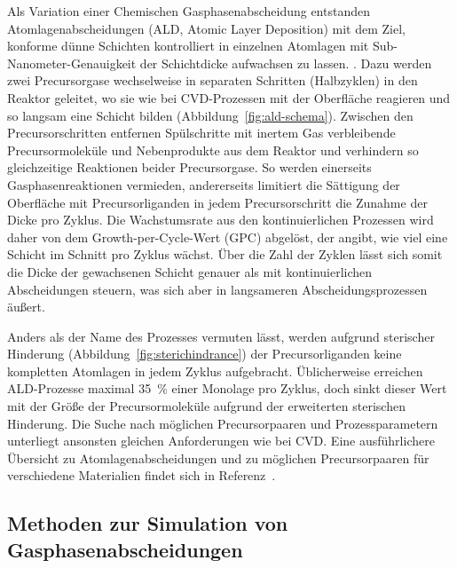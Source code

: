 Als Variation einer Chemischen Gasphasenabscheidung entstanden Atomlagenabscheidungen (ALD, Atomic Layer Deposition) mit dem Ziel, konforme dünne Schichten kontrolliert in einzelnen Atomlagen mit Sub-Nanometer-Genauigkeit der Schichtdicke aufwachsen zu lassen\cite{suntola_method_1977,puurunen_surface_2005,elliott_atomic-scale_2012}.
.
Dazu werden zwei Precursorgase wechselweise in separaten Schritten (Halbzyklen) in den Reaktor geleitet, wo sie wie bei CVD-Prozessen mit der Oberfläche reagieren und so langsam eine Schicht bilden (Abbildung~\ref{fig:ald-schema}).
Zwischen den Precursorschritten entfernen Spülschritte mit inertem Gas verbleibende Precursormoleküle und Nebenprodukte aus dem Reaktor und verhindern so gleichzeitige Reaktionen beider Precursorgase.
So werden einerseits Gasphasenreaktionen vermieden, andererseits limitiert die Sättigung der Oberfläche mit Precursorliganden in jedem Precursorschritt die Zunahme der Dicke pro Zyklus.
Die Wachstumsrate aus den kontinuierlichen Prozessen wird daher von dem Growth-per-Cycle-Wert (GPC) abgelöst, der angibt, wie viel eine Schicht im Schnitt pro Zyklus wächst.
Über die Zahl der Zyklen lässt sich somit die Dicke der gewachsenen Schicht genauer als mit kontinuierlichen Abscheidungen steuern, was sich aber in langsameren Abscheidungsprozessen äußert.

Anders als der Name des Prozesses vermuten lässt, werden aufgrund sterischer Hinderung (Abbildung~\ref{fig:sterichindrance}) der Precursorliganden keine kompletten Atomlagen in jedem Zyklus aufgebracht.
Üblicherweise erreichen ALD-Prozesse maximal \SI{35}{\percent} einer Monolage pro Zyklus\cite{ylilammi_monolayer_1996}, doch sinkt dieser Wert mit der Größe der Precursormoleküle aufgrund der erweiterten sterischen Hinderung.
Die Suche nach möglichen Precursorpaaren und Prozessparametern unterliegt ansonsten gleichen Anforderungen wie bei CVD.
Eine ausführlichere Übersicht zu Atomlagenabscheidungen und zu möglichen Precursorpaaren für verschiedene Materialien findet sich in Referenz~\cite{puurunen_surface_2005}.

\subsection{Methoden zur Simulation von Gasphasenabscheidungen}

